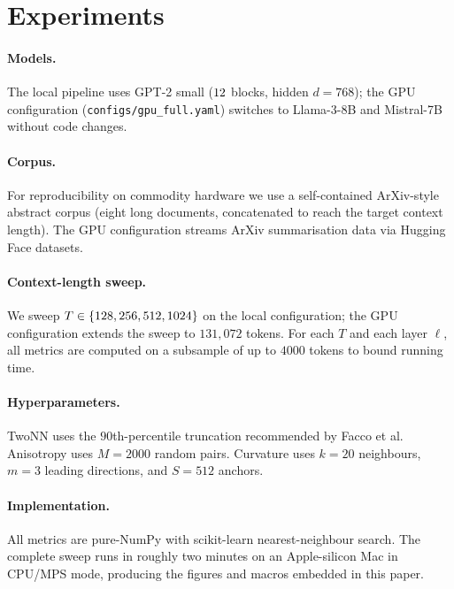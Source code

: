 \section{Experiments}\label{sec:experiments}

\paragraph{Models.} The local pipeline uses GPT-2 small ($12$
blocks, hidden $d=768$); the GPU configuration (\texttt{configs/gpu\_full.yaml})
switches to Llama-3-8B and Mistral-7B without code changes.

\paragraph{Corpus.} For reproducibility on commodity hardware we use a
self-contained ArXiv-style abstract corpus (eight long documents,
concatenated to reach the target context length). The GPU configuration
streams ArXiv summarisation data via Hugging Face datasets.

\paragraph{Context-length sweep.} We sweep $T \in \{128, 256, 512, 1024\}$
on the local configuration; the GPU configuration extends the sweep to
$131{,}072$ tokens. For each $T$ and each layer $\ell$, all metrics are
computed on a subsample of up to $4000$ tokens to bound running time.

\paragraph{Hyperparameters.} TwoNN uses the $90$th-percentile truncation
recommended by Facco et al. Anisotropy uses $M=2000$ random pairs.
Curvature uses $k=20$ neighbours, $m=3$ leading directions, and $S=512$
anchors.

\paragraph{Implementation.} All metrics are pure-NumPy with scikit-learn
nearest-neighbour search. The complete sweep runs in roughly two minutes on
an Apple-silicon Mac in CPU/MPS mode, producing the figures and macros
embedded in this paper.
